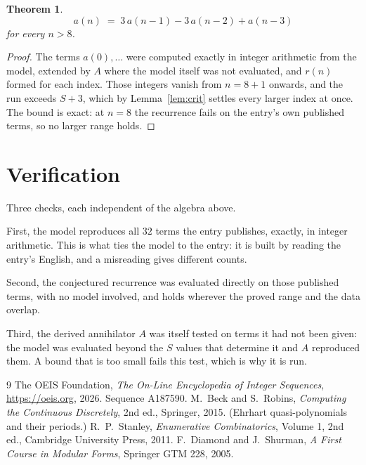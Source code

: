 \documentclass[11pt,a4paper]{article}
\theoremstyle{plain}
\newtheorem{theorem}{Theorem}
\theoremstyle{definition}
\begin{document}
\begin{theorem}
\[
a(n)\;=\;3\,a(n-1) - 3\,a(n-2) + a(n-3)
\]
for every $n>8$.
\end{theorem}

\begin{proof}
The terms $a(0),\dots$ were computed exactly in integer arithmetic from the model, extended by
$A$ where the model itself was not evaluated, and $r(n)$ formed for each index. Those integers
vanish from $n=8+1$ onwards, and the run exceeds $S+3$, which by
Lemma~\ref{lem:crit} settles every larger index at once. The bound is exact: at $n=8$ the recurrence fails on the entry's own published terms, so no larger range holds.
\end{proof}

\section{Verification}

Three checks, each independent of the algebra above.

First, the model reproduces all $32$ terms the entry publishes, exactly, in integer
arithmetic. This is what ties the model to the entry: it is built by reading the entry's
English, and a misreading gives different counts.

Second, the conjectured recurrence was evaluated directly on those published terms, with no
model involved, and holds wherever the proved range and the data overlap.

Third, the derived annihilator $A$ was itself tested on terms it had not been given: the model
was evaluated beyond the $S$ values that determine it and $A$ reproduced them. A bound that is
too small fails this test, which is why it is run.

\begin{thebibliography}{9}
 The OEIS Foundation, \emph{The On-Line Encyclopedia of Integer
Sequences}, \url{https://oeis.org}, 2026. Sequence A187590.
 M.~Beck and S.~Robins, \emph{Computing the Continuous Discretely},
2nd ed., Springer, 2015. (Ehrhart quasi-polynomials and their periods.)
 R.~P.~Stanley, \emph{Enumerative Combinatorics}, Volume 1, 2nd ed.,
Cambridge University Press, 2011.
 F.~Diamond and J.~Shurman, \emph{A First Course in Modular Forms},
Springer GTM 228, 2005.
\end{thebibliography}
\end{document}
